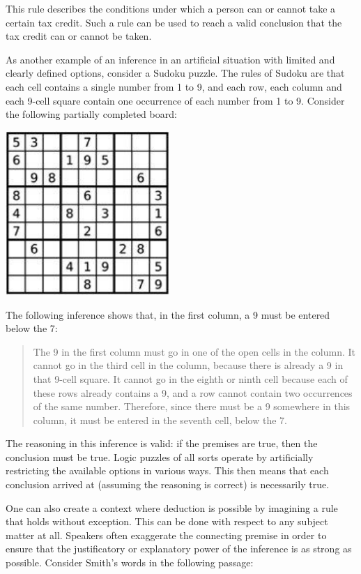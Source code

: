 This rule describes the conditions under which a person can or cannot take a certain tax credit. Such a rule can be used to reach a valid conclusion that the tax credit can or cannot be taken.

As another example of an inference in an artificial situation with limited and clearly defined options, consider a Sudoku puzzle. The rules of Sudoku are that each cell contains a single number from 1 to 9, and each row, each column and each 9-cell square contain one occurrence of each number from 1 to 9. Consider the following partially completed board:

\begin{center}
\noindent \includegraphics*[width=2.45in, height=2.45in, keepaspectratio=false]{img/sudoku}
\end{center}

The following inference shows that, in the first column, a 9 must be entered below the 7:

\begin{quotation} The 9 in the first column must go in one of the open cells in the column. It cannot go in the third cell in the column, because there is already a 9 in that 9-cell square. It cannot go in the eighth or ninth cell because each of these rows already contains a 9, and a row cannot contain two occurrences of the same number. Therefore, since there must be a 9 somewhere in this column, it must be entered in the seventh cell, below the 7.\end{quotation}

The reasoning in this inference is valid: if the premises are true, then the conclusion must be true. Logic puzzles of all sorts operate by artificially restricting the available options in various ways. This then means that each conclusion arrived at (assuming the reasoning is correct) is necessarily true. 

One can also create a context where deduction is possible by imagining a rule that holds without exception. This can be done with respect to any subject matter at all. Speakers often exaggerate the connecting premise in order to ensure that the justificatory or explanatory power of the inference is as strong as possible. Consider Smith's words in the following passage: 


